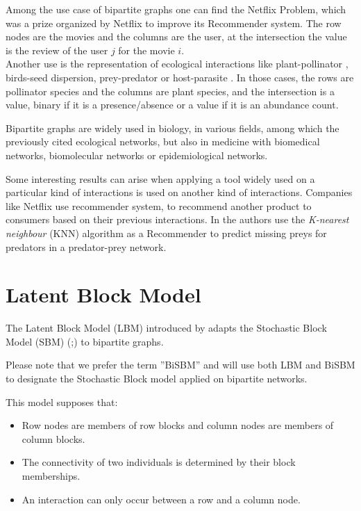 \documentclass[12pt,a4paper]{report}
\begin{document}
Among the use case of bipartite graphs one can find the Netflix Problem, which
was a prize organized by Netflix to improve its Recommender system. The row 
nodes are the movies and the columns are the user, at the intersection the value
is the review of the user $j$ for the movie $i$.\\

Another use is the representation of ecological interactions like 
plant-pollinator \parencite{ramos-jilibertoTopologicalChangeAndean2010}, birds-seed
dispersion, prey-predator or
host-parasite \parencite{kaszewska-gilasGlobalStudiesHostParasite2021}.
In those cases, the rows are pollinator species and the columns are plant 
species, and the intersection is a value, binary if it is a presence/absence or
a value if it is an abundance count.

Bipartite graphs are widely used in biology, in various fields, among which the
previously cited ecological networks, but also in medicine with biomedical
networks, biomolecular networks or epidemiological 
networks. \parencite{pavlopoulosBipartiteGraphsSystems2018}


Some interesting results can arise when applying a tool widely used on a particular
kind of interactions is used on another kind of interactions. Companies like
Netflix use recommender system, to recommend another product to consumers based
on their previous interactions.
In \cite{desjardins-proulxEcologicalInteractionsNetflix2017} the authors use the
\emph{K-nearest neighbour} (KNN) algorithm as a Recommender to predict missing
preys for predators in a predator-prey network.

\section{Latent Block Model}

The Latent Block Model (LBM) introduced by \cite{govaertLatentBlockModel2010} 
adapts the Stochastic Block Model (SBM) 
(\cite{hollandStochasticBlockmodelsFirst1983};\cite{snijdersEstimationPredictionStochastic1997})
to bipartite graphs.

\begin{small}
Please note that we prefer the term ''BiSBM'' and will use both LBM and BiSBM to
designate the Stochastic Block model applied on bipartite networks.
\end{small}

This model supposes that:
\begin{itemize}
    \item Row nodes are members of row blocks and column nodes are members of 
    column blocks.
    \item The connectivity of two individuals is determined by their block 
    memberships.
    \item An interaction can only occur between a row and a column node.
\end{itemize}
\end{document}
